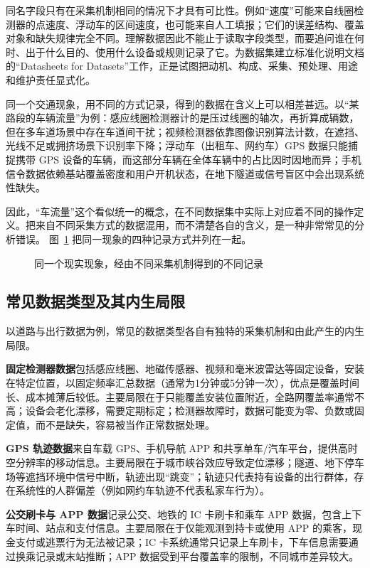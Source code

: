 同名字段只有在采集机制相同的情况下才具有可比性。例如“速度”可能来自线圈检测器的点速度、浮动车的区间速度，也可能来自人工填报；它们的误差结构、覆盖对象和缺失规律完全不同。理解数据因此不能止于读取字段类型，而要追问谁在何时、出于什么目的、使用什么设备或规则记录了它。为数据集建立标准化说明文档的“Datasheets for Datasets”工作，正是试图把动机、构成、采集、预处理、用途和维护责任显式化\cite{gebru2021datasheets}。

同一个交通现象，用不同的方式记录，得到的数据在含义上可以相差甚远。以“某路段的车辆流量”为例：感应线圈检测器计的是压过线圈的轴次，再折算成辆数，但在多车道场景中存在车道间干扰；视频检测器依靠图像识别算法计数，在遮挡、光线不足或拥挤场景下识别率下降；浮动车（出租车、网约车）GPS 数据只能捕捉携带 GPS 设备的车辆，而这部分车辆在全体车辆中的占比因时因地而异；手机信令数据依赖基站覆盖密度和用户开机状态，在地下隧道或信号盲区中会出现系统性缺失。

因此，“车流量”这个看似统一的概念，在不同数据集中实际上对应着不同的操作定义。把来自不同采集方式的数据混用，而不清楚各自的含义，是一种非常常见的分析错误。
图~\ref{fig:ch04_collection} 把同一现象的四种记录方式并列在一起。

\begin{figure}[H]
  \centering
  \caption{同一个现实现象，经由不同采集机制得到的不同记录}
  \label{fig:ch04_collection}
\end{figure}

\subsection{常见数据类型及其内生局限}

以道路与出行数据为例，常见的数据类型各自有独特的采集机制和由此产生的内生局限。

\textbf{固定检测器数据}包括感应线圈、地磁传感器、视频和毫米波雷达等固定设备，安装在特定位置，以固定频率汇总数据（通常为1分钟或5分钟一次），优点是覆盖时间长、成本摊薄后较低。主要局限在于只能覆盖安装位置附近，全路网覆盖率通常不高；设备会老化漂移，需要定期标定；检测器故障时，数据可能变为零、负数或固定值，而不是缺失，容易被当作正常数据处理。

\textbf{GPS 轨迹数据}来自车载 GPS、手机导航 APP 和共享单车/汽车平台，提供高时空分辨率的移动信息。主要局限在于城市峡谷效应导致定位漂移；隧道、地下停车场等遮挡环境中信号中断，轨迹出现“跳变”；轨迹只代表持有设备的出行群体，存在系统性的人群偏差（例如网约车轨迹不代表私家车行为）。

\textbf{公交刷卡与 APP 数据}记录公交、地铁的 IC 卡刷卡和乘车 APP 数据，包含上下车时间、站点和支付信息。主要局限在于仅能观测到持卡或使用 APP 的乘客，现金支付或逃票行为无法被记录；IC 卡系统通常只记录上车刷卡，下车信息需要通过换乘记录或末站推断；APP 数据受到平台覆盖率的限制，不同城市差异较大。

